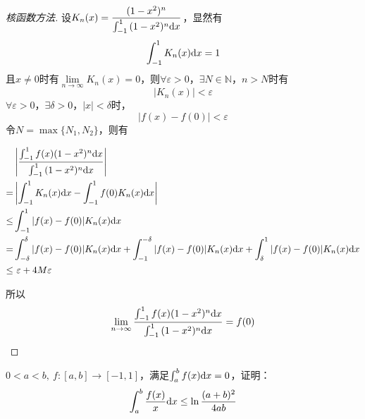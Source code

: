 \begin{proof}[核函数方法]

    设$K_n(x) = \dfrac{(1 - x^2)^n}{\int_{-1}^{1}{(1 - x^2)^n}\mathrm{d} x}$，显然有
    $$\int_{-1}^{1}{K_n(x)}\mathrm{d} x = 1$$
    且$x \neq 0$时有$\lim\limits_{n\to\infty}{K_n(x)} = 0$，则$\forall \varepsilon >0$，$\exists N \in \mathbb{N}$，$n > N$时有
    $$|K_n(x)| < \varepsilon$$$\forall \varepsilon >0$，$\exists \delta > 0$，$|x| < \delta$时，
    $$| f(x) - f(0) | < \varepsilon$$
    令$N = \max\{N_1, N_2\}$，则有

    \begin{align*}
        & \left| \dfrac{\int_{-1}^{1}{f(x)(1 - x^2)^n}\mathrm{d} x}{\int_{-1}^{1}{(1 - x^2)^n}\mathrm{d} x} \right| \\
        = & \left| \int_{-1}^{1}{K_n(x)}\mathrm{d} x - \int_{-1}^{1}{f(0)K_n(x)}\mathrm{d} x \right| \\
        \leq & \int_{-1}^{1}{|f(x) - f(0)|K_n(x)}\mathrm{d} x \\
        = & \int_{-\delta}^{\delta}{|f(x) - f(0)|K_n(x)}\mathrm{d} x + \int_{-1}^{-\delta}{|f(x) - f(0)|K_n(x)}\mathrm{d} x + \int_{\delta}^{1}{|f(x) - f(0)|K_n(x)}\mathrm{d} x \\
        \leq & \  \varepsilon + 4M\varepsilon
    \end{align*}

    所以
    $$\lim_{n\to\infty}{\dfrac{\int_{-1}^{1}{f(x)(1 - x^2)^n}\mathrm{d} x}{\int_{-1}^{1}{(1 - x^2)^n}\mathrm{d} x}} = f(0)$$

\end{proof}

\begin{proposition}

    $0 < a < b,\ f:[a,b] \to [-1,1]$，满足$\int_{a}^{b}{f(x)}\mathrm{d} x = 0$，证明：
    $$\int_{a}^{b}{\dfrac{f(x)}{x}}\mathrm{d} x \leq \ln{\dfrac{(a+b)^2}{4ab}}$$

\end{proposition}


